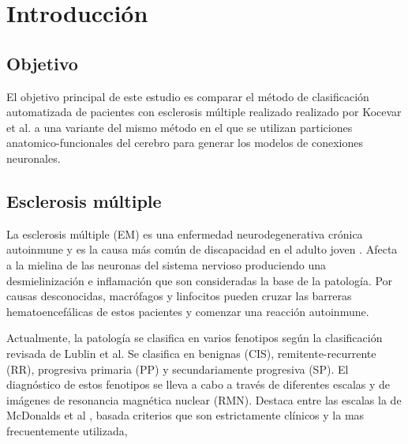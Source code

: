 \documentclass[fleqn,10pt]{UICArticle} %
\affiliation{\textsuperscript{1}\textit{Facultad de Medicina, Universitat Internacional de Catalunya, Barcelona, Spain}} %
\affiliation{*\textbf{Datos de contacto}: gabriel.mp@uic.es} %
\begin{document}
\flushbottom 

\maketitle

\tableofcontents

\thispagestyle{empty} 


\section{Introducción}

\subsection{Objetivo}

El objetivo principal de este estudio es comparar el método de clasificación automatizada de pacientes con esclerosis múltiple realizado realizado por Kocevar et al.\cite{Kocevar2016} a una variante del mismo método en el que se utilizan particiones anatomico-funcionales del cerebro para generar los modelos de conexiones neuronales.


\subsection{Esclerosis múltiple}

La esclerosis múltiple (EM) es una enfermedad neurodegenerativa crónica autoinmune y es la causa más común de discapacidad en el adulto joven \cite{Polman2011}. Afecta a la mielina de las neuronas del sistema nervioso produciendo una desmielinización e inflamación que son consideradas la base de la patología. Por causas desconocidas, macrófagos y linfocitos pueden cruzar las barreras hematoencefálicas de estos pacientes y comenzar una reacción autoinmune.

Actualmente, la patología se clasifica en varios fenotipos según la clasificación revisada de Lublin et al\cite{Lublin2014}.
 Se clasifica en benignas (CIS), remitente-recurrente (RR), progresiva primaria (PP) y secundariamente progresiva (SP). El diagnóstico de estos fenotipos se lleva a cabo a través de diferentes escalas y de imágenes de resonancia magnética nuclear (RMN). Destaca entre las escalas la de McDonalds et al \cite{Polman20112}, basada criterios que son estrictamente clínicos y la mas frecuentemente utilizada,
\end{document}
